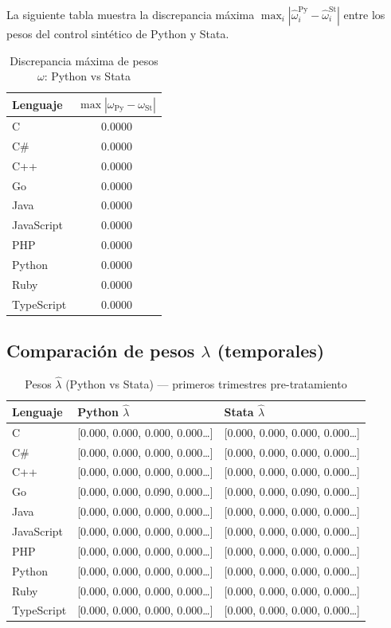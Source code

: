 \documentclass[12pt,a4paper]{article}
\begin{document}
La siguiente tabla muestra la discrepancia m\'axima $\max_i |\hat{\omega}_i^{\mathrm{Py}} - \hat{\omega}_i^{\mathrm{St}}|$
entre los pesos del control sint\'etico de Python y Stata.

\begin{table}[htbp]\centering
\caption{Discrepancia m\'axima de pesos $\omega$: Python vs Stata}
\begin{tabular}{lc}
\toprule
Lenguaje & $\max |\omega_{\mathrm{Py}} - \omega_{\mathrm{St}}|$ \\
\midrule
  C & 0.0000 \\
  C\# & 0.0000 \\
  C++ & 0.0000 \\
  Go & 0.0000 \\
  Java & 0.0000 \\
  JavaScript & 0.0000 \\
  PHP & 0.0000 \\
  Python & 0.0000 \\
  Ruby & 0.0000 \\
  TypeScript & 0.0000 \\
\bottomrule
\end{tabular}
\end{table}

\subsection*{Comparaci\'on de pesos $\lambda$ (temporales)}

\begin{table}[htbp]\centering
\caption{Pesos $\hat{\lambda}$ (Python vs Stata) — primeros trimestres pre-tratamiento}
\begin{tabular}{lll}
\toprule
Lenguaje & \textcolor{pyblue}{Python $\hat{\lambda}$} & \textcolor{statagreen}{Stata $\hat{\lambda}$} \\
\midrule
  C & [0.000, 0.000, 0.000, 0.000\ldots] & [0.000, 0.000, 0.000, 0.000\ldots] \\
  C\# & [0.000, 0.000, 0.000, 0.000\ldots] & [0.000, 0.000, 0.000, 0.000\ldots] \\
  C++ & [0.000, 0.000, 0.000, 0.000\ldots] & [0.000, 0.000, 0.000, 0.000\ldots] \\
  Go & [0.000, 0.000, 0.090, 0.000\ldots] & [0.000, 0.000, 0.090, 0.000\ldots] \\
  Java & [0.000, 0.000, 0.000, 0.000\ldots] & [0.000, 0.000, 0.000, 0.000\ldots] \\
  JavaScript & [0.000, 0.000, 0.000, 0.000\ldots] & [0.000, 0.000, 0.000, 0.000\ldots] \\
  PHP & [0.000, 0.000, 0.000, 0.000\ldots] & [0.000, 0.000, 0.000, 0.000\ldots] \\
  Python & [0.000, 0.000, 0.000, 0.000\ldots] & [0.000, 0.000, 0.000, 0.000\ldots] \\
  Ruby & [0.000, 0.000, 0.000, 0.000\ldots] & [0.000, 0.000, 0.000, 0.000\ldots] \\
  TypeScript & [0.000, 0.000, 0.000, 0.000\ldots] & [0.000, 0.000, 0.000, 0.000\ldots] \\
\bottomrule
\end{tabular}
\end{table}
\end{document}
